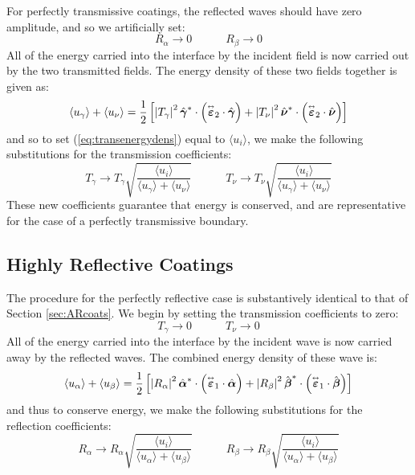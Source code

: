 \documentclass[11pt, reqno]{book}%
\newcounter{ct}
\newcommand{\es}{\begin{equation}}
\newcommand{\ef}{\end{equation} \vspace{0.05in}}
\newcommand{\mbf}{\mathbf}
\newcommand{\mbfg}[1]{\mbf{\mbox{\boldmath$#1$}}}
\newcommand{\mbfgh}[1]{\hat{\mbfg{#1}}}
\newcommand{\ve}{\varepsilon}
\newcommand{\tens}{\overset{\text{\tiny$\leftrightarrow$}}}
\begin{document}
For perfectly transmissive coatings, the reflected waves should have zero amplitude, and so we artificially set:
\es
R_\alpha \to 0 \quad\quad\quad R_\beta \to 0
\ef
\noindent All of the energy carried into the interface by the incident field is now carried out by the two transmitted fields. The energy density of these two fields together is given as:
\es
\langle u_\gamma \rangle +\langle u_\nu \rangle= \frac{1}{2}\left[  \left| T_\gamma \right|^2 \mbfgh{\gamma}^* \cdot \left(\tens{\mbfg{\ve}}_2 \cdot \mbfgh{\gamma}\right)   + \left| T_\nu \right|^2 \mbfgh{\nu}^* \cdot \left( \tens{\mbfg{\ve}}_2 \cdot \mbfgh{\nu}\right)\right]
\label{eq:transenergydens}
\ef 
\noindent and so to set (\ref{eq:transenergydens}) equal to $\langle u_i \rangle$, we make the following substitutions for the transmission coefficients:
\es
T_\gamma \to T_\gamma \sqrt{\frac{\langle u_i \rangle}{\langle u_\gamma \rangle +\langle u_\nu \rangle}}  \quad\quad\quad T_\nu \to  T_\nu \sqrt{\frac{\langle u_i \rangle}{\langle u_\gamma \rangle +\langle u_\nu \rangle}}
\ef
\noindent These new coefficients guarantee that energy is conserved, and are representative for the case of a perfectly transmissive boundary.




\subsection{Highly Reflective Coatings}
\label{sec:HRcoats}

The procedure for the perfectly reflective case is substantively identical to that of Section \ref{sec:ARcoats}. We begin by setting the transmission coefficients to zero:
\es
T_\gamma \to 0 \quad\quad\quad T_\nu \to 0
\ef
\noindent All of the energy carried into the interface by the incident wave is now carried away by the reflected waves. The combined energy density of these wave is:
\es
\langle u_\alpha \rangle +\langle u_\beta \rangle= \frac{1}{2}\left[  \left| R_\alpha \right|^2 \mbfgh{\alpha}^* \cdot \left(\tens{\mbfg{\ve}}_1 \cdot \mbfgh{\alpha}\right)   + \left| R_\beta \right|^2 \mbfgh{\beta}^* \cdot \left( \tens{\mbfg{\ve}}_1 \cdot \mbfgh{\beta}\right)\right]
\label{eq:reflenergydens}
\ef 
\noindent and thus to conserve energy, we make the following substitutions for the reflection coefficients:
\es
R_\alpha \to R_\alpha \sqrt{\frac{\langle u_i \rangle}{\langle u_\alpha \rangle +\langle u_\beta \rangle}}  \quad\quad\quad R_\beta \to  R_\beta \sqrt{\frac{\langle u_i \rangle}{\langle u_\alpha \rangle +\langle u_\beta \rangle}}
\ef
\end{document}
